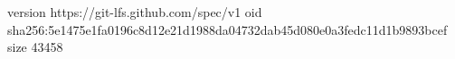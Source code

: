 version https://git-lfs.github.com/spec/v1
oid sha256:5e1475e1fa0196c8d12e21d1988da04732dab45d080e0a3fedc11d1b9893bcef
size 43458
